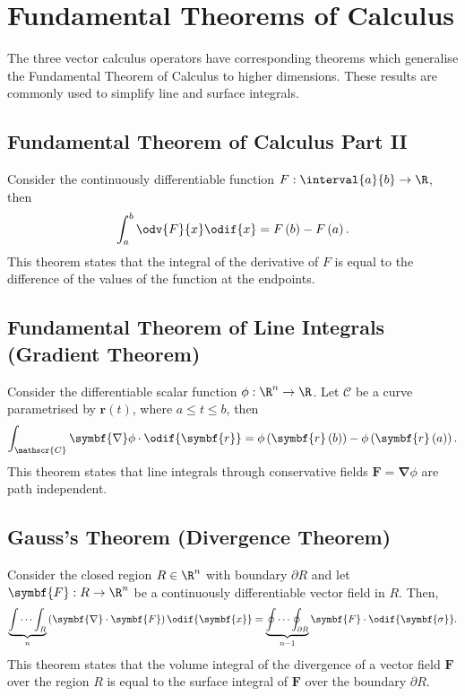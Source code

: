\documentclass{article}
\begin{document}
\section{Fundamental Theorems of Calculus}
The three vector calculus operators have corresponding theorems which
generalise the Fundamental Theorem of Calculus to higher dimensions.
These results are commonly used to simplify line and surface integrals.
\subsection{Fundamental Theorem of Calculus Part II}
Consider the continuously differentiable function \(F:\interval{a}{b}
\to \R\), then
\begin{equation*}
    \int_a^b \odv{F}{x} \odif{x} = F\left( b \right) - F\left( a \right).
\end{equation*}
This theorem states that the integral of the derivative of \(F\) is
equal to the difference of the values of the function at the endpoints.
\subsection{Fundamental Theorem of Line Integrals (Gradient Theorem)}
Consider the differentiable scalar function \(\phi:\R^n \to \R\). Let
\(\mathscr{C}\) be a curve parametrised by \(\symbf{r}\left( t
\right)\), where \(a \leq t \leq b\), then
\begin{equation*}
    \int_{\mathscr{C}} \symbf{\nabla} \phi \cdot \odif{\symbf{r}} = \phi\left( \symbf{r}\left( b \right) \right) - \phi\left( \symbf{r}\left( a \right) \right).
\end{equation*}
This theorem states that line integrals through conservative fields
\(\symbf{F} = \symbf{\nabla} \phi\) are path independent.
\subsection{Gauss's Theorem (Divergence Theorem)}
Consider the closed region \(R \in \R^n\) with boundary \(\partial R\)
and let \(\symbf{F}:R \to \R^n\) be a continuously differentiable
vector field in \(R\). Then,
\begin{equation*}
    \underbrace{\int \cdots \int_R}_n \left( \symbf{\nabla} \cdot \symbf{F} \right) \odif{\symbf{x}} = \underbrace{\oint \cdots \oint_{\partial R}}_{n-1} \symbf{F} \cdot \odif{\symbf{\sigma}}.
\end{equation*}
This theorem states that the volume integral of the divergence of a
vector field \(\symbf{F}\) over the region \(R\) is equal to the surface
integral of \(\symbf{F}\) over the boundary \(\partial R\).
\end{document}
